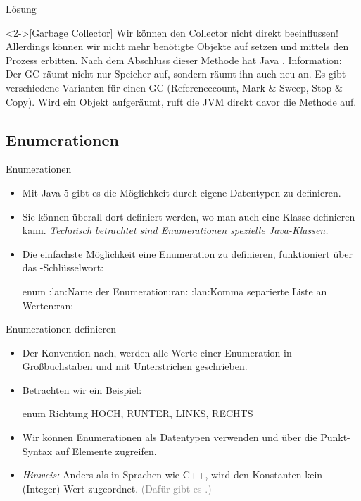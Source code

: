 \ifull
\begin{frame}[c]{Lösung}
    \begin{solve}<2->[Garbage Collector]
        Wir können den Collector nicht direkt beeinflussen!\pause{} Allerdings können wir nicht mehr benötigte Objekte auf  setzen\pause{} und mittels  den Prozess erbitten. Nach dem Abschluss dieser Methode hat Java .\pause{}\medskip\newline
        Information: Der GC räumt nicht nur Speicher auf, sondern räumt ihn auch neu an.\pause{} Es gibt verschiedene Varianten für einen GC (Referencecount,\pause{} Mark \& Sweep,\pause{} Stop \& Copy).\pause{} Wird ein Objekt aufgeräumt,\pause{} ruft die JVM direkt davor die Methode  auf.
    \end{solve}
\end{frame}
\fi

\subsection{Enumerationen}
\begin{frame}[fragile]{Enumerationen}
    \begin{itemize}[<+(1)->]
        \widei
        \item Mit Java-5 gibt es die Möglichkeit durch  eigene Datentypen zu definieren.
        \item Sie können überall dort definiert werden,\pause{} wo man auch eine Klasse definieren kann.\pause{} \textit{Technisch betrachtet sind Enumerationen spezielle Java-Klassen.}
        \item Die einfachste Möglichkeit eine Enumeration zu definieren,\pause{} funktioniert über das -Schlüsselwort:\pause{}
\begin{plainjava}
enum :lan:Name der Enumeration:ran: {
    :lan:Komma separierte Liste an Werten:ran:
}
\end{plainjava}
    \end{itemize}
\end{frame}

\begin{frame}[fragile]{Enumerationen definieren}
    \begin{itemize}[<+(1)->]
        \widei
        \item Der Konvention nach, werden alle Werte einer Enumeration in Großbuchstaben und mit Unterstrichen geschrieben.
        \item Betrachten wir ein Beispiel:\pause{}
\begin{plainjava}
enum Richtung {
    HOCH, RUNTER, LINKS, RECHTS
}
\end{plainjava}
        \item Wir können Enumerationen als Datentypen verwenden und über die Punkt-Syntax auf Elemente zugreifen.
        \item \textit{Hinweis:} Anders als in Sprachen wie C++,\pause{} wird den Konstanten kein (Integer)-Wert zugeordnet.\pause{} \textcolor{gray}{(Dafür gibt es .)}
    \end{itemize}
\end{frame}

